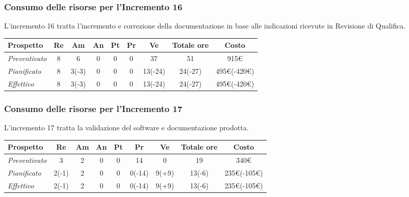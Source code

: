 {{{{{{{{{{{{{{{{\subsubsection{Consumo delle risorse per l'Incremento 16}
L'incremento 16 tratta l'incremento e correzione della documentazione in base alle indicazioni ricevute in Revisione di Qualifica.
\quad
\def\tabularxcolumn#1{m{#1}}
{

	\begin{center}
		\renewcommand{\arraystretch}{1.4}
		\begin{tabularx}{\textwidth}{|X|c|c|c|c|c|c|c|c|}
			\hline
			\rowcolor{airforceblue}
			\textbf{Prospetto} & \textbf{Re} & \textbf{Am} & \textbf{An} & \textbf{Pt} & \textbf{Pr} & \textbf{Ve} & \textbf{Totale ore} & \textbf{Costo} \\
			\hline
			\textit{Preventivato}  & 8 & 6 & 0 & 0 & 0 & 37 & 51 & 915\euro\\
			\hline
			\textit{Pianificato} & 8 & 3(-3) & 0 & 0 & 0 & 13(-24) & 24(-27) & 495\euro(-420\euro) \\
			\hline
			\textit{Effettivo} & 8 & 3(-3) & 0 & 0 & 0 & 13(-24) & 24(-27) & 495\euro(-420\euro) \\
			\hline
		\end{tabularx}
	\end{center}


\subsubsection{Consumo delle risorse per l'Incremento 17}
L'incremento 17 tratta la validazione del software e documentazione prodotta.
\quad
\def\tabularxcolumn#1{m{#1}}
{

	\begin{center}
		\renewcommand{\arraystretch}{1.4}
		\begin{tabularx}{\textwidth}{|X|c|c|c|c|c|c|c|c|}
			\hline
			\rowcolor{airforceblue}
			\textbf{Prospetto} & \textbf{Re} & \textbf{Am} & \textbf{An} & \textbf{Pt} & \textbf{Pr} & \textbf{Ve} & \textbf{Totale ore} & \textbf{Costo} \\
			\hline
			\textit{Preventivato} & 3 & 2 & 0 & 0 & 14 & 0 & 19 & 340\euro\\
			\hline
			\textit{Pianificato} & 2(-1) & 2 & 0 & 0 & 0(-14) & 9(+9) & 13(-6) & 235\euro(-105\euro) \\
			\hline
			\textit{Effettivo} & 2(-1) & 2 & 0 & 0 & 0(-14) & 9(+9) & 13(-6) & 235\euro(-105\euro) \\
			\hline
		\end{tabularx}
	\end{center}

}}}}}}}}}}}}}}}}}}
